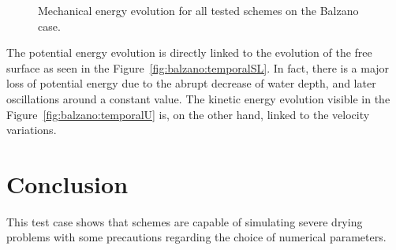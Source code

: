 \begin{figure}[H]
  \centering
  \caption{Mechanical energy evolution for all tested schemes on the Balzano case.}
\label{fig:balzano:Em}
\end{figure}

The potential energy evolution is directly linked to the evolution of the free surface as
seen in the Figure~\ref{fig:balzano:temporalSL}. In fact, there is a major loss of
potential energy due to the abrupt decrease of water depth, and later oscillations around a constant value.
The kinetic energy evolution visible in the Figure~\ref{fig:balzano:temporalU} is,
on the other hand, linked to the velocity variations.



%
\section{Conclusion}

This test case shows that  schemes are capable of simulating severe drying problems
with some precautions regarding the choice of numerical parameters.


